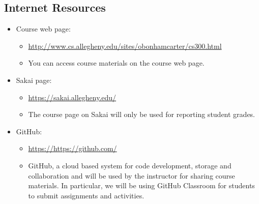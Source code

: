\documentclass[11pt]{article} %
\begin{document}
\subsection*{\textbf{Internet Resources}}
\begin{itemize}
  \item Course web page: 
  \begin{itemize}
    \item \url{http://www.cs.allegheny.edu/sites/obonhamcarter/cs300.html}
    \item You can access course materials on the course web page.
  \end{itemize}
  
  \item Sakai page: 
  \begin{itemize}
    \item \url{https://sakai.allegheny.edu/}
    \item The course page on Sakai will only be used for reporting student grades.
  \end{itemize}
  
  \item GitHub: 
  \begin{itemize}
    \item \url{https://https://github.com/}
    \item GitHub, a cloud based system for code development, storage and collaboration and will be used by the instructor for sharing course materials. In particular, we will be using GitHub Classroom for students to submit assignments and activities.
  \end{itemize}
\end{itemize}





\end{document}
